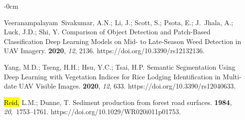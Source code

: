 \documentclass[remotesensing,article,accept,pdftex,moreauthors]{Definitions/mdpi}
\begin{document}
\begin{adjustwidth}{-\extralength}{0cm}
\begin{thebibliography}{999}
Veeranampalayam~Sivakumar, A.N.; Li, J.; Scott, S.; Psota, E.; J.~Jhala, A.;
  Luck, J.D.; Shi, Y.
\newblock Comparison of Object Detection and Patch-Based Classification Deep
  Learning Models on Mid- to Late-Season Weed Detection in UAV Imagery.
 {\bf 2020}, {\em 12}, {2136.}
\newblock https://doi.org/10.3390/rs12132136.

Yang, M.D.; Tseng, H.H.; Hsu, Y.C.; Tsai, H.P.
\newblock Semantic Segmentation Using Deep Learning with Vegetation Indices for
  Rice Lodging Identification in Multi-date UAV Visible Images.
 {\bf 2020}, {\em 12}, {633}.
\newblock https://doi.org/10.3390/rs12040633.

\hl{Reid,} %
 L.M.; Dunne, T.
\newblock Sediment production from forest road surfaces.
 {\bf 1984}, {\em 20},~1753--1761. https://doi.org/10.1029/WR020i011p01753.

\end{thebibliography}




\end{adjustwidth}
\end{document}
